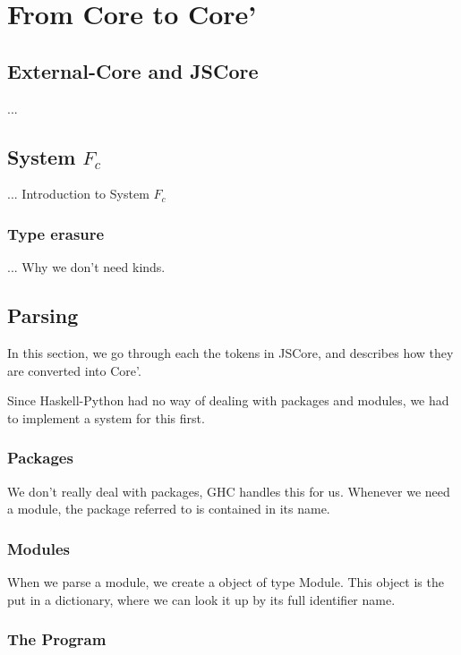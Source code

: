 

\chapter{From Core to Core'}
\label{chap:rewrite}

\section{External-Core and JSCore}

...

\section{System $F_c$}

... Introduction to System $F_c$

\cite{sulzmann2007system}


\subsection{Type erasure}

... Why we don't need kinds.


\section{Parsing}

In this section, we go through each the tokens in JSCore, and describes
how they are converted into Core'.

Since Haskell-Python had no way of dealing with packages and modules, 
we had to implement a system for this first.

\subsection{Packages}

We don't really deal with packages, GHC handles this for us. Whenever we
need a module, the package referred to is contained in its name.

\subsection{Modules}

When we parse a module, we create a object of type Module. This object is
the put in a dictionary, where we can look it up by its full identifier name.

\subsection{The Program}

